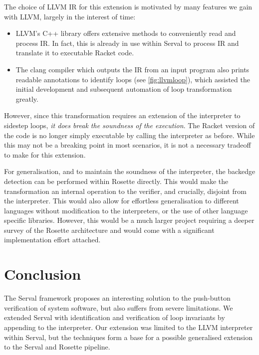 \documentclass[11pt,a4paper,runningheads]{llncs}
\newcommand{\serval}{Serval\xspace}
\newcommand{\racket}{\textsf{Racket}\xspace}
\newcommand{\rosette}{\textsf{Rosette}\xspace}
\newcommand{\cclang}{\textsf{clang}\xspace}
\begin{document}
The choice of LLVM IR for this extension is motivated by many features we gain
with LLVM, largely in the interest of time:

\begin{itemize}
    \item LLVM's C++ library offers extensive methods to conveniently read and
    process IR. In fact, this is already in use within Serval to process IR and
    translate it to executable Racket code.
    
    \item The \cclang compiler \cite{clang} which outputs the IR from an input
    program also prints readable annotations to identify loops (see
    \autoref{fig:llvmloop}), which assisted the initial development and
    subsequent automation of loop transformation greatly.
\end{itemize}

However, since this transformation requires an extension of the interpreter to
sidestep loops, \emph{it does break the soundness of the execution}. The \racket
version of the code is no longer simply executable by calling the interpreter as
before. While this may not be a breaking point in most scenarios, it is not a
necessary tradeoff to make for this extension.

For generalisation, and to maintain the soundness of the interpreter, the
backedge detection can be performed within \rosette directly. This would make
the transformation an internal operation to the verifier, and crucially,
disjoint from the interpreter. This would also allow for effortless
generalisation to different languages without modification to the interpreters,
or the use of other language specific libraries. However, this would be a much
larger project requiring a deeper survey of the \rosette architecture and would
come with a significant implementation effort attached.

\section{Conclusion}

The \serval framework proposes an interesting solution to the push-button
verification of system software, but also suffers from severe limitations. We
extended \serval with identification and verification of loop invariants by
appending to the interpreter. Our extension was limited to the LLVM interpreter
within \serval, but the techniques form a base for a possible generalised
extension to the \serval and \rosette pipeline. 
\end{document}
